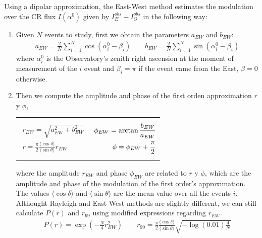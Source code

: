 \documentclass[12pt, doublespace, oneside]{article}
\begin{document}
Using a dipolar approximation, the East-West method estimates the modulation over the CR flux $I(\alpha^0)$ given by $I^{obs}_E -  I^{obs}_O$ in the following way:

\begin{enumerate}
    \item Given $N$ events to study, first we obtain the parameters $a_{EW}$ and $b_{EW}$:
    \begin{align}
        a_{EW} = \frac{2}{N} \sum^N_{i=1}\cos(\alpha^0_i - \beta_i) \qquad
        b_{EW} = \frac{2}{N} \sum^N_{i=1}\sin(\alpha^0_i - \beta_i)
    \end{align}
    where $\alpha^0_i$  is the Observatory's zenith right ascension at the moment of measurement of the $i$ event and $\beta_i=\pi$ if the event came from the East, $\beta=0$ otherwise.  
    \item Then we compute the amplitude and phase of the first orden approximation $r$ y $\phi$,
    
    \begin{tabular}{@{}p{.4\linewidth}@{}p{.5\linewidth}@{}}
        \begin{align}
            r_{EW} = \sqrt{a_{EW}^2 + b_{EW}^2} \\
            r   =\frac{\pi}{2} \frac{\langle\cos\delta \rangle}{\langle\sin\theta \rangle} r_{EW}\label{dperp} 
        \end{align}
        &    \begin{align}
            \phi_{EW} = \arctangent{\frac{b_{EW}}{a_{EW}}} \\
            \phi = \phi_{EW}+ \frac{\pi}{2} \label{phase_fisico}
        \end{align}
      \end{tabular}

      where the amplitude $r_{EW}$ and phase $\phi_{EW}$ are related to  $r$ y $\phi$, which are the amplitude and phase of the modulation of the first order's approximation. The values $\langle\cos\delta \rangle$ and $\langle\sin\theta \rangle$ are the mean value over all the events $i$. Althought Rayleigh and  East-West methods are slightly different, we can still calculate $P(r)$ and $r_{99}$  using modified expressions regarding $r_{EW}$.
      \begin{align}
        P(r) =  \exp(-\frac{N}{4}r_{EW}^2) \qquad
        r_{99} = \frac{\pi}{2} \frac{\langle\cos\delta \rangle}{\langle\sin\theta \rangle}\sqrt{-\log(0.01)\frac{4}{N}}
    \end{align}



\end{enumerate}
\end{document}
